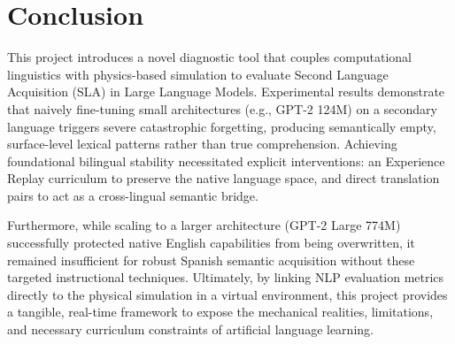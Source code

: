 \section{Conclusion}
\label{sec:conclusion}

This project introduces a novel diagnostic tool that couples computational linguistics with physics-based simulation to evaluate Second Language Acquisition (SLA) in Large Language Models. Experimental results demonstrate that naively fine-tuning small architectures (e.g., GPT-2 124M) on a secondary language triggers severe catastrophic forgetting, producing semantically empty, surface-level lexical patterns rather than true comprehension. Achieving foundational bilingual stability necessitated explicit interventions: an Experience Replay curriculum to preserve the native language space, and direct translation pairs to act as a cross-lingual semantic bridge. 

Furthermore, while scaling to a larger architecture (GPT-2 Large 774M) successfully protected native English capabilities from being overwritten, it remained insufficient for robust Spanish semantic acquisition without these targeted instructional techniques. Ultimately, by linking NLP evaluation metrics directly to the physical simulation in a virtual environment, this project provides a tangible, real-time framework to expose the mechanical realities, limitations, and necessary curriculum constraints of artificial language learning.